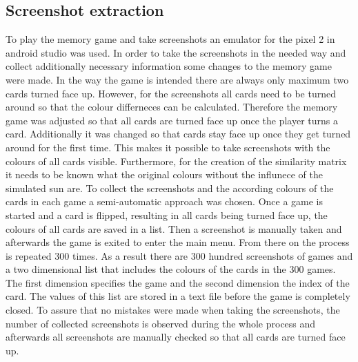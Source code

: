 \subsection{Screenshot extraction}
To play the memory game and take screenshots an emulator for the pixel 2 in android studio was used. In order to take the screenshots in the needed way and collect additionally necessary information some changes to the memory game were made. In the way the game is intended there are always only maximum two cards turned face up. However, for the screenshots all cards need to be turned around so that the colour differneces can be calculated. Therefore the memory game was adjusted so that all cards are turned face up once the player turns a card. Additionally it was changed so that cards stay face up once they get turned around for the first time. This makes it possible to take screenshots with the colours of all cards visible. Furthermore, for the creation of the similarity matrix it needs to be known what the original colours without the influnece of the simulated sun are. To collect the screenshots and the according colours of the cards in each game a semi-automatic approach was chosen. Once a game is started and a card is flipped, resulting in all cards being turned face up, the colours of all cards are saved in a list. Then a screenshot is manually taken and afterwards the game is exited to enter the main menu. From there on the process is repeated 300 times. As a result there are 300 hundred screenshots of games and a two dimensional list that includes the colours of the cards in the 300 games. The first dimension specifies the game and the second dimension the index of the card. The values of this list are stored in a text file before the game is completely closed. To assure that no mistakes were made when taking the screenshots, the number of collected screenshots is observed during the whole process and afterwards all screenshots are manually checked so that all cards are turned face up. 

